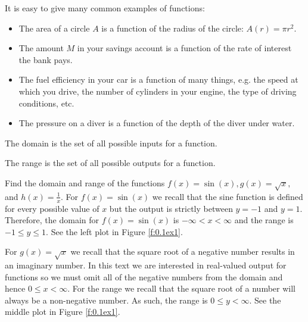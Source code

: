 It is easy to give many common examples of functions:
\begin{itemize}
    \item The area of a circle $A$ is a function of the radius of the circle:  $A(r)= \pi r^2$.
    \item The amount $M$ in your savings account is a function of the rate of interest the
        bank pays.
    \item The fuel efficiency in your car is a function of many things, e.g. the speed at
        which you drive, the number of cylinders in your engine, the type of driving
        conditions, etc.
    \item The pressure on a diver is a function of the depth of the diver under water.
\end{itemize}

\begin{definition}
    The domain is the set of all possible inputs for a function.
\end{definition}

\begin{definition}
    The range is the set of all possible outputs for a function.
\end{definition}

\bex
Find the domain and range of the functions $f(x) = \sin(x), g(x) = \sqrt{x},$ and $h(x) =
    \frac{1}{x}$.
\eex
For $f(x)=\sin(x)$ we recall that the sine function is defined for every possible value of $x$ but
the output is strictly between $y=-1$ and $y=1$.  Therefore, the domain for $f(x) =
\sin(x)$ is $-\infty < x < \infty$ and the range is $-1 \le y \le 1$.  See the left plot
in Figure \ref{f:0.1ex1}.

For $g(x) = \sqrt{x}$ we recall that the square root of a negative number results in an
imaginary number.  In this text we are interested in real-valued output for functions so
we must omit all of the negative numbers from the domain and hence $0 \le x < \infty$.
For the range we recall that the square root of a number will always be a non-negative
number.  As such, the range is $0 \le y < \infty$.  See the middle plot
in Figure \ref{f:0.1ex1}.

